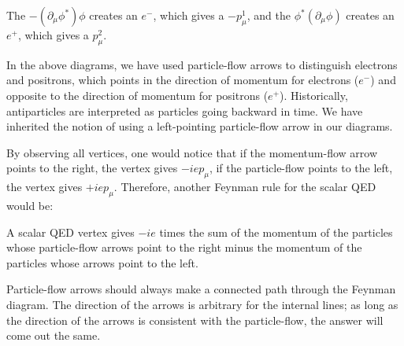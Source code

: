 \documentclass[11pt]{article}
\theoremstyle{definition}
\begin{document}
\begin{enumerate}
\begin{center}
    \end{center}
    The $-(\partial_\mu\phi^*)\phi$ creates an $e^-$, which gives a $-p_\mu^1$, and the $\phi^*(\partial_\mu\phi)$ creates an $e^+$, which gives a $p_\mu^2$.
\end{enumerate}
In the above diagrams, we have used particle-flow arrows to distinguish electrons and positrons, which points in the direction of momentum for electrons ($e^-$) and opposite to the direction of momentum for positrons ($e^+$). Historically, antiparticles are interpreted as particles going backward in time. We have inherited the notion of using a left-pointing particle-flow arrow in our diagrams.

By observing all vertices, one would notice that if the momentum-flow arrow points to the right, the vertex gives $-iep_\mu$, if the particle-flow points to the left, the vertex gives $+iep_\mu$. Therefore, another Feynman rule for the scalar QED would be:
\begin{shaded}
    A scalar QED vertex gives $-ie$ times the sum of the momentum of the particles whose particle-flow arrows point to the right minus the momentum of the particles whose arrows point to the left.
\end{shaded}
Particle-flow arrows should always make a connected path through the Feynman diagram. The direction of the arrows is arbitrary for the internal lines; as long as the direction of the arrows is consistent with the particle-flow, the answer will come out the same.
\end{document}
